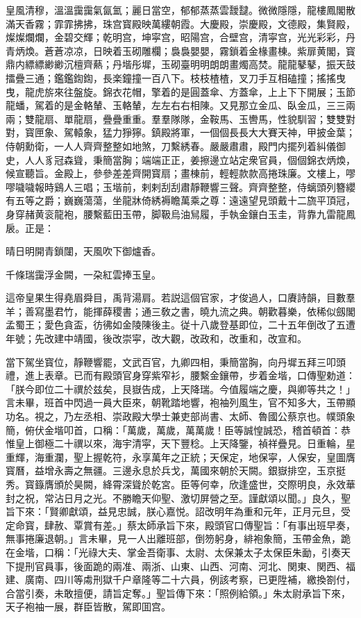 \begin{myquote}
皇風清穆，溫溫靄靄氣氤氳；麗日當空，郁郁蒸蒸雲靉靆。微微隱隱，龍樓鳳閣散滿天香霧；霏霏拂拂，珠宫寳殿映萬縷朝霞。大慶殿，崇慶殿，文德殿，集賢殿，燦燦爛爛，金碧交輝；乾明宫，坤寜宫，昭陽宫，合壁宫，清寜宫，光光彩彩，丹青炳煥。蒼蒼凉凉，日映着玉砌雕欄；裊裊嬰嬰，霧鎖着金椽畫棟。紫扉黄閣，寳鼎内縹縹緲緲沉檀齊爇；丹堦彤墀，玉砌臺明明朗朗畫燭高焚。龍龍鼕鼕，振天鼓擂疊三通；鑑鑑鍧鍧，長楽鐘撞一百八下。枝枝楂楂，叉刀手互相磕撞；搖搖曳曳，龍虎旂來往盤旋。錦衣花帽，擎着的是圓蓋傘、方蓋傘，上上下下開展；玉節龍蟠，駕着的是金輅輦、玉輅輦，左左右右相陳。又見那立金瓜、臥金瓜，三三兩兩；雙龍扇、單龍扇，疊疊重重。羣羣隊隊，金鞍馬、玉轡馬，性貌馴習；雙雙對對，寳匣象、駕轅象，猛力猙獰。鎮殿將軍，一個個長長大大賽天神，甲披金葉；侍朝勳衛，一人人齊齊整整如地煞，刀繫綉春。嚴嚴肅肅，殿門内擺列着糾儀御史，人人豸冠森聳，秉簡當胸；端端正正，姜擦邊立站定衆官員，個個錦衣炳煥，候宣聽旨。金殿上，參參差差齊開寳扇；畫棟前，輕輕款款高捲珠廉。文樓上，嘐嘐噦噦報時鷄人三唱；玉堦前，剌剌刮刮肅靜鞭響三聲。齊齊整整，侍螭頭列簪纓有五等之爵；巍巍蕩蕩，坐龍牀倚綉褥瞻萬乘之尊：遠遠望見頭戴十二旒平頂冠，身穿赭黄衮龍袍，腰繫藍田玉帶，脚靸烏油舃履，手執金鑲白玉圭，背靠九雷龍鳳扆。正是：

晴日明開青鎖闥，天風吹下御爐香。

千條瑞靄浮金闕，一朶紅雲捧玉皇。
\end{myquote}

這帝皇果生得堯眉舜目，禹背湯肩。若説這個官家，才俊過人，口賡詩韻，目數羣羊；善寫墨君竹，能揮薛稷書；通三敎之書，曉九流之典。朝歡暮樂，依稀似劔閣孟蜀王；愛色貪盃，彷彿如金陵陳後主。従十八歲登基即位，二十五年倒改了五遭年號；先改建中靖國，後改崇寜，改大觀，改政和，改重和，改宣和。

當下駕坐寳位，靜鞭響罷，文武百官，九卿四相，秉簡當胸，向丹墀五拜三叩頭禮，進上表章。已而有殿頭官身穿紫窄衫，腰繫金鑲帶，步着金堦，口傳聖勅道：「朕今即位二十禩於兹矣，艮嶽告成，上天降瑞。今值履端之慶，與卿等共之！」言未畢，班首中閃過一員大臣來，朝靴踏地響，袍袖列風生，官不知多大，玉帶顯功名。視之，乃左丞相、崇政殿大學士兼吏部尚書、太師、魯國公蔡京也。幞頭象簡，俯伏金堦叩首，口稱：「萬歲，萬歲，萬萬歲！臣等誠惶誠恐，稽首頓首：恭惟皇上御極二十禩以來，海宇清寜，天下豐稔。上天降鑒，禎祥疊見。日重輪，星重輝，海重瀾，聖上握乾符，永享萬年之正統；天保定，地保寜，人保安，皇圖膺寳曆，益增永壽之無疆。三邊永息於兵戈，萬國來朝於天闕。銀嶽排空，玉京挺秀。寳籙膺頒於昊闕，絳霄深聳於乾宮。臣等何幸，欣逢盛世，交際明良，永效華封之祝，常沾日月之光。不勝瞻天仰聖、激切屏營之至。謹獻頌以聞。」良久，聖旨下來：「賢卿獻頌，益見忠誠，朕心嘉悦。詔改明年為重和元年，正月元旦，受定命寳，肆赦、覃賞有差。」蔡太師承旨下來，殿頭官口傳聖旨：「有事出班早奏，無事捲廉退朝。」言未畢，見一人出離班部，倒笏躬身，緋袍象簡，玉帶金魚，跪在金堦，口稱：「光祿大夫、掌金吾衛事、太尉、太保兼太子太保臣朱勔，引奏天下提刑官員事，後面跪的兩准、兩浙、山東、山西、河南、河北、関東、関西、福建、廣南、四川等䖏刑獄千户章隆等二十六員，例該考察，已更陞補，繳換劄付，合當引奏，未敢擅便，請旨定奪。」聖旨傳下來：「照例給領。」朱太尉承旨下來，天子袍袖一展，群臣皆散，駕即囬宫。

